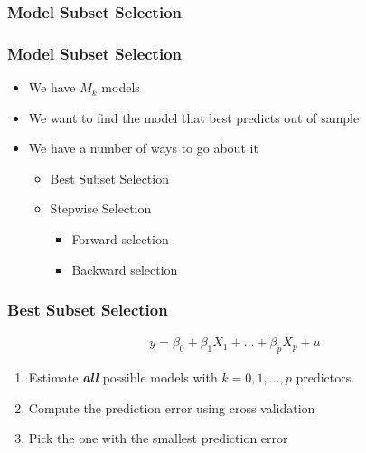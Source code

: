 \documentclass[
  shownotes,
  xcolor={svgnames},
  hyperref={colorlinks,citecolor=DarkBlue,linkcolor=DarkRed,urlcolor=DarkBlue}
  , aspectratio=169]{beamer}
\begin{document}
\frametitle{Model Subset Selection}
\begin{frame}[fragile]
\frametitle{Model Subset Selection}

\begin{itemize}
\item We have $M_k$ models 
\bigskip
\item We want to find the model that best predicts out of sample
\bigskip
\item We have a number of ways to go about it
\bigskip
\begin{itemize}
  \item Best Subset Selection
  \medskip
  \item Stepwise Selection
  \begin{itemize}
    \item Forward selection
    \medskip
    \item Backward selection
  \end{itemize}
\end{itemize}
\end{itemize}
\end{frame}


\begin{frame}[fragile]
\frametitle{Best Subset Selection}
\begin{align}
  y = \beta_0 + \beta_1 X_1 + \dots + \beta_p X_p +u
\end{align}

\begin{enumerate}
\item Estimate {\it \bf all} possible models with $k=0,1,..., p$ predictors.
\bigskip
\item Compute the prediction error using cross validation

\bigskip
\item  Pick the one with the smallest prediction error 
\end{enumerate}

\end{frame}
\end{document}

